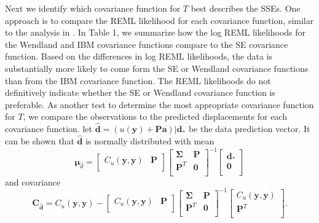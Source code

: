 \documentclass[10pt,a4paper]{article}
\begin{document}
Next we identify which covariance function for $T$ best describes the SSEs. One approach is to compare the REML likelihood for each covariance function, similar to the analysis in \citet{Langbein2004}. In Table 1, we summarize how the log REML likelihoods for the Wendland and IBM covariance functions compare to the SE covariance function.  Based on the differences in log REML likelihoods, the data is substantially more likely to come form the SE or Wendland covariance functions than from the IBM covariance function. The REML likelihoods do not definitively indicate whether the SE or Wendland covariance function is preferable.  As another test to determine the most appropriate covariance function for $T$, we compare the observations to the predicted displacements for each covariance function. let $\hat{\bm{d}} = \left(u(\bm{y}) + \bm{P}\bm{a}\right)|\bm{d}_*$ be the data prediction vector. It can be shown that $\hat{\bm{d}}$ is normally distributed with mean 
\begin{equation}\label{eq:DataPredMean}
\bm{\mu}_{\hat{d}} = \left[\begin{array}{cc}
                           C_u(\bm{y},\bm{y}) & \bm{P} \\
                           \end{array}\right]
                     \left[\begin{array}{cc}
                           \bm{\Sigma} & \bm{P} \\
                           \bm{P}^T  & \bm{0} \\
                           \end{array}\right]^{-1}
                     \left[\begin{array}{c}
                           \bm{d}_* \\
                           \bm{0} \\
                           \end{array}\right]
\end{equation}  
and covariance
\begin{equation}\label{eq:DataPredCov}
\bm{C}_{\hat{\bm{d}}} = C_u(\bm{y},\bm{y}) - 
                        \left[\begin{array}{cc}
                              C_u(\bm{y},\bm{y}) & \bm{P} \\
                              \end{array}\right]
                        \left[\begin{array}{cc}
                              \bm{\Sigma} & \bm{P} \\
                              \bm{P}^T  & \bm{0} \\
                              \end{array}\right]^{-1}
                        \left[\begin{array}{c}
                              C_u(\bm{y},\bm{y}) \\
                              \bm{P}^T \\
                              \end{array}\right].
\end{equation}
\end{document}
